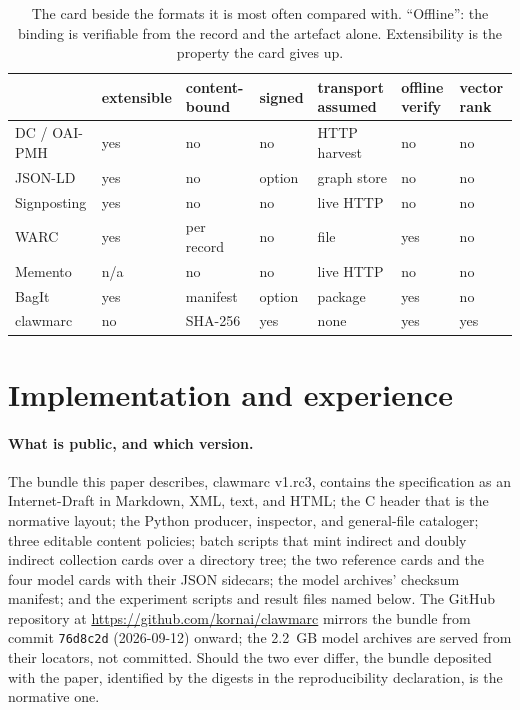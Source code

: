 \documentclass[sigconf]{acmart}
\begin{document}
\begin{table}[t]
\caption{The card beside the formats it is most often compared with.
``Offline'': the binding is verifiable from the record and the artefact
alone. Extensibility is the property the card gives up.}
\label{tab:compare}
\footnotesize
\setlength{\tabcolsep}{2.2pt}
\begin{tabular}{@{}lp{0.85cm}p{0.95cm}p{0.85cm}p{1.15cm}p{0.85cm}p{0.75cm}@{}}
\toprule
 & extens\-ible & content-bound & signed & transport assumed & offline verify & vector rank \\
\midrule
DC / OAI-PMH & yes & no & no & HTTP harvest & no & no \\
JSON-LD & yes & no & option & graph store & no & no \\
Signposting & yes & no & no & live HTTP & no & no \\
WARC & yes & per record & no & file & yes & no \\
Memento & n/a & no & no & live HTTP & no & no \\
BagIt & yes & manifest & option & package & yes & no \\
clawmarc & no & SHA-256 & yes & none & yes & yes \\
\bottomrule
\end{tabular}
\end{table}

\section{Implementation and experience}
\label{sec:impl}

\paragraph{What is public, and which version.} The bundle this paper
describes, clawmarc v1.rc3, contains the specification as an Internet-Draft
in Markdown, XML, text, and HTML; the C header that is the normative layout;
the Python producer, inspector, and general-file cataloger; three editable
content policies; batch scripts that mint indirect and doubly indirect
collection cards over a directory tree; the two reference cards and the four
model cards with their JSON sidecars; the model archives' checksum manifest;
and the experiment scripts and result files named below. The GitHub
repository at \url{https://github.com/kornai/clawmarc} mirrors the bundle
from commit \texttt{76d8c2d} (2026-09-12) onward; the 2.2~GB model archives
are served from their locators, not committed. Should the two ever differ, the bundle
deposited with the paper, identified by the digests in the reproducibility
declaration, is the normative one.
\end{document}
